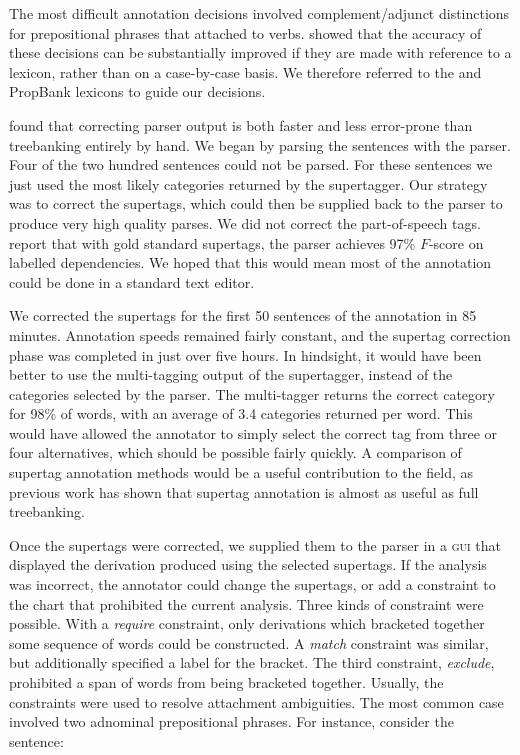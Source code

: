 The most difficult annotation decisions involved complement/adjunct distinctions
for prepositional phrases that attached to verbs. \citet{propbank} showed that
the accuracy of these decisions can be substantially improved if they are made
with reference to a lexicon, rather than on a case-by-case basis. We therefore
referred to the \ccgbank and PropBank lexicons to guide our decisions. 

\citet{marcus:93} found that correcting parser output is both faster and less
error-prone than treebanking entirely by hand. We began by parsing the sentences
with the \candc parser. Four of the two hundred sentences could not be parsed.
For these sentences we just used the most likely categories returned by the
supertagger. Our strategy was to correct the supertags, which could then be
supplied back to the parser to produce very high quality parses. We did not
correct the part-of-speech tags. \citet{clark:cl07} report that with gold
standard supertags, the parser achieves 97\% $F$-score on labelled dependencies.
We hoped that this would mean most of the annotation could be done in a standard
text editor.

We corrected the supertags for the first 50 sentences of the annotation in 85
minutes. Annotation speeds remained fairly constant, and the supertag correction
phase was completed in just over five hours. In hindsight, it would have been
better to use the multi-tagging output of the supertagger, instead of the
categories selected by the parser. The multi-tagger returns the correct category
for 98\% of words, with an average of 3.4 categories returned per word. This
would have allowed the annotator to simply select the correct tag from three or
four alternatives, which should be possible fairly quickly. A comparison of
supertag annotation methods would be a useful contribution to the field, as
previous work \citep{clark:emnlp04,rimell:08} has shown that supertag annotation
is almost as useful as full \ccg treebanking.

Once the supertags were corrected, we supplied them to the parser in a
\textsc{gui} that displayed the derivation produced using the selected
supertags. If the analysis was incorrect, the annotator could change the
supertags, or add a constraint to the chart that prohibited the current
analysis. Three kinds of constraint were possible. With a \emph{require}
constraint, only derivations which bracketed together some sequence of words
could be constructed. A \emph{match} constraint was similar, but additionally
specified a label for the bracket. The third constraint, \emph{exclude},
prohibited a span of words from being bracketed together. Usually, the
constraints were used to resolve attachment ambiguities. The most common case
involved two adnominal prepositional phrases. For instance, consider the
sentence:

